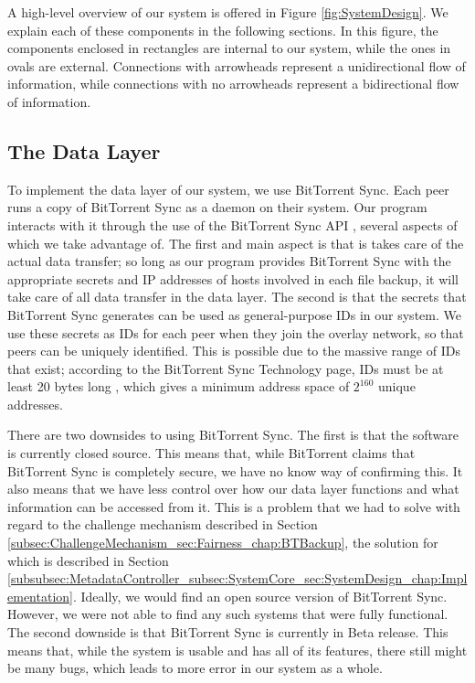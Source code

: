 \documentclass[12pt]{report}
\begin{document}
A high-level overview of our system is offered in Figure \ref{fig:SystemDesign}. We explain each of these components in the following sections. In this figure, the components enclosed in rectangles are internal to our system, while the ones in ovals are external. Connections with arrowheads represent a unidirectional flow of information, while connections with no arrowheads represent a bidirectional flow of information.

\subsection{The Data Layer}
To implement the data layer of our system, we use BitTorrent Sync. Each peer runs a copy of BitTorrent Sync as a daemon on their system. Our program interacts with it through the use of the BitTorrent Sync API \cite{btsyncapi}, several aspects of which we take advantage of. The first and main aspect is that is takes care of the actual data transfer; so long as our program provides BitTorrent Sync with the appropriate secrets and IP addresses of hosts involved in each file backup, it will take care of all data transfer in the data layer. The second is that the secrets that BitTorrent Sync generates can be used as general-purpose IDs in our system. We use these secrets as IDs for each peer when they join the overlay network, so that peers can be uniquely identified. This is possible due to the massive range of IDs that exist; according to the BitTorrent Sync Technology page, IDs must be at least 20 bytes long \cite{btsynctech}, which gives a minimum address space of $2^{160}$ unique addresses.

There are two downsides to using BitTorrent Sync. The first is that the software is currently closed source. This means that, while BitTorrent claims that BitTorrent Sync is completely secure, we have no know way of confirming this. It also means that we have less control over how our data layer functions and what information can be accessed from it. This is a problem that we had to solve with regard to the challenge mechanism described in Section \ref{subsec:ChallengeMechanism_sec:Fairness_chap:BTBackup}, the solution for which is described in Section \ref{subsubsec:MetadataController_subsec:SystemCore_sec:SystemDesign_chap:Implementation}. Ideally, we would find an open source version of BitTorrent Sync. However, we were not able to find any such systems that were fully functional. The second downside is that BitTorrent Sync is currently in Beta release. This means that, while the system is usable and has all of its features, there still might be many bugs, which leads to more error in our system as a whole.
\end{document}
